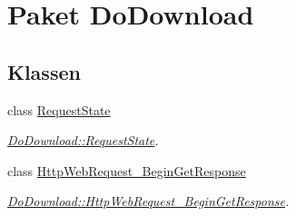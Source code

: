 \hypertarget{namespace_do_download}{\section{Paket Do\-Download}
\label{namespace_do_download}
}
\subsection*{Klassen}
\begin{DoxyCompactItemize}
\item 
class \hyperlink{class_do_download_1_1_request_state}{Request\-State}
\begin{DoxyCompactList}\small\item\em \hyperlink{class_do_download_1_1_request_state}{Do\-Download\-::\-Request\-State}. \end{DoxyCompactList}\item 
class \hyperlink{class_do_download_1_1_http_web_request___begin_get_response}{Http\-Web\-Request\-\_\-\-Begin\-Get\-Response}
\begin{DoxyCompactList}\small\item\em \hyperlink{class_do_download_1_1_http_web_request___begin_get_response}{Do\-Download\-::\-Http\-Web\-Request\-\_\-\-Begin\-Get\-Response}. \end{DoxyCompactList}\end{DoxyCompactItemize}
